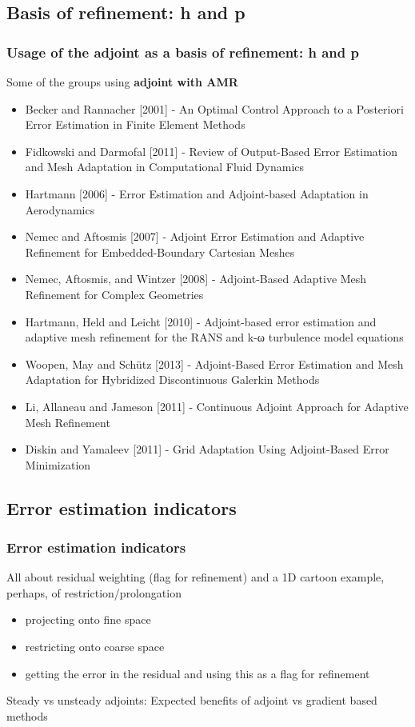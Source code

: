 \documentclass{beamer}
\begin{document}
\subsection[Usage]{Basis of refinement: h and p}
\begin{frame}%
\frametitle{\scriptsize{Usage of the adjoint as a basis of refinement: h and p}}
\scriptsize
Some of the groups using \textbf{adjoint with AMR}
\begin{itemize}
\item Becker and Rannacher [2001] - An Optimal Control Approach to a Posteriori Error Estimation in Finite Element Methods
\item Fidkowski and Darmofal [2011] - Review of Output-Based Error Estimation and Mesh Adaptation in Computational Fluid Dynamics
\item Hartmann [2006] - Error Estimation and Adjoint-based Adaptation in Aerodynamics
\item Nemec and Aftosmis [2007] - Adjoint Error Estimation and Adaptive Refinement for Embedded-Boundary Cartesian Meshes
\item Nemec, Aftosmis, and Wintzer [2008] - Adjoint-Based Adaptive Mesh Refinement for Complex Geometries
\item Hartmann, Held and Leicht [2010] - Adjoint-based error estimation and adaptive mesh refinement for the RANS and k-ω turbulence model equations
\item Woopen, May and Sch{\"u}tz [2013] - Adjoint-Based Error Estimation and Mesh Adaptation for Hybridized Discontinuous Galerkin Methods
\item Li, Allaneau and Jameson [2011] - Continuous Adjoint Approach for Adaptive Mesh Refinement
\item Diskin and Yamaleev [2011] - Grid Adaptation Using Adjoint-Based Error Minimization
\end{itemize}
\end{frame}


\subsection[Estimation]{Error estimation indicators}
\begin{frame}
\scriptsize
\frametitle{Error estimation indicators}
All about residual weighting (flag for refinement) and a 1D cartoon example, perhaps, of restriction/prolongation
\begin{itemize}
\item projecting onto fine space
\item restricting onto coarse space
\item getting the error in the residual and using this as a flag for refinement
\end{itemize}
Steady vs unsteady adjoints:
Expected benefits of adjoint vs gradient based methods
\end{frame}
\end{document}
